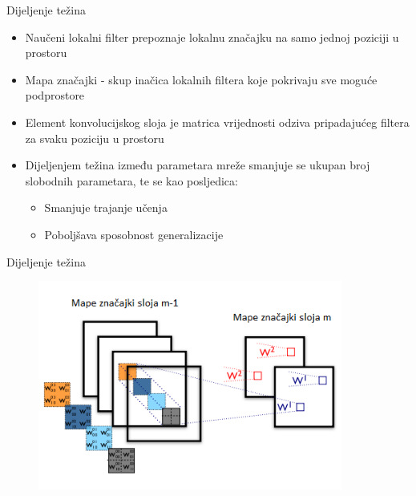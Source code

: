 \documentclass[pdf]{beamer}
\begin{document}
\begin{frame}{Dijeljenje težina}

\begin{itemize}
\setlength\itemsep{0.5em}

	\item  Naučeni lokalni filter prepoznaje lokalnu značajku na samo jednoj poziciji u prostoru 
	
	\item Mapa značajki - skup inačica lokalnih filtera koje pokrivaju sve moguće podprostore
	
	\item Element konvolucijskog sloja je matrica vrijednosti odziva  pripadajućeg filtera za svaku poziciju u prostoru

	\item Dijeljenjem težina između parametara mreže smanjuje se ukupan broj slobodnih parametara, te se kao posljedica:
	
	\begin{itemize}
		\item Smanjuje trajanje učenja
 		\item Poboljšava sposobnost generalizacije 
 	\end{itemize}

	
\end{itemize} 

\end{frame}

\begin{frame}{Dijeljenje težina}

\begin{figure}
\centering
\includegraphics[width=10cm]{slike/shared_weights.png}
\end{figure}

\end{frame}
\end{document}
